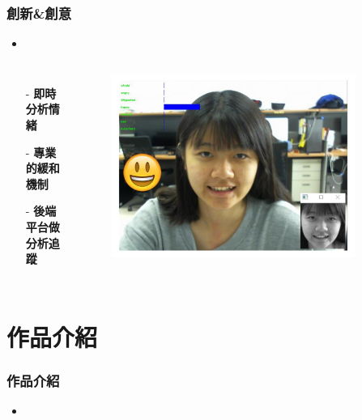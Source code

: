 \documentclass[10pt, conference, compsocconf]{beamer}
\begin{document}
\begin{CJK}{UTF8}{}
\begin{frame}
\end{frame}

\begin{frame}
\frametitle{創新\&創意}

\begin{itemize}
\item{}
\end{itemize}

\begin{columns}
\begin{itemize}
\item[-] \Large\bf 即時分析情緒
\vspace{5mm}
\item[-] \Large\bf 專業的緩和機制
\vspace{5mm}
\item[-] \Large\bf 後端平台做分析追蹤
\end{itemize}

\begin{figure}[!t]
\begin{flushright}
\includegraphics[width=0.9\textwidth]{Figures/DetectResult.pdf}
\end{flushright}
\end{figure}
\end{columns}

\end{frame}


\section{作品介紹}

\begin{frame}
\frametitle{作品介紹}
\begin{itemize}
\item {}
\end{itemize}


\end{frame}
\end{CJK}
\end{document}
